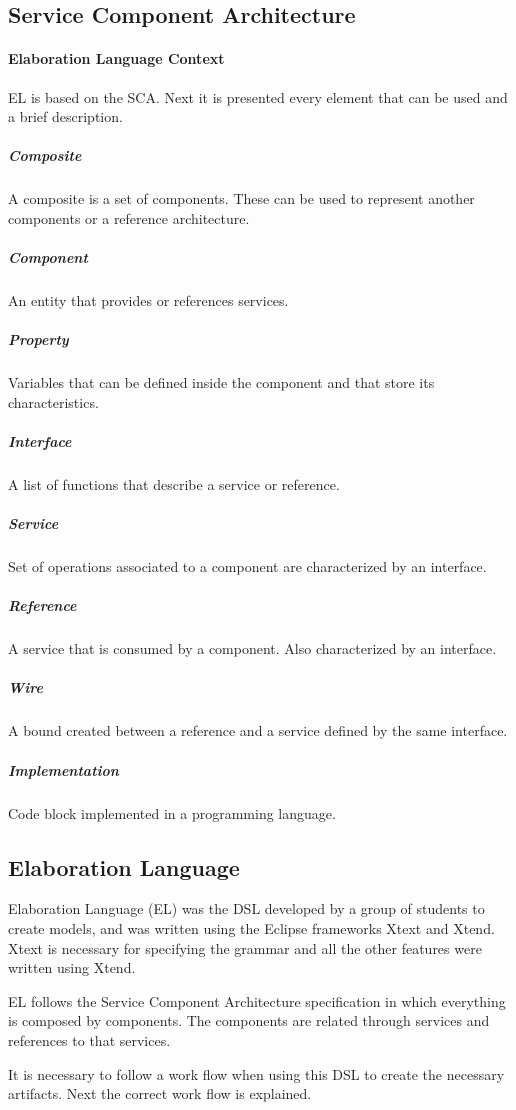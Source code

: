 \documentclass{report}
\begin{document}
		\subsection{Service Component Architecture}
		\par 
		
		\paragraph{Elaboration Language Context} EL is based on the SCA. Next it is presented every element that can be used and a brief description.
		
			\subparagraph{Composite} A composite is a set of components. These can be used to represent another components or a reference architecture.
		
			\subparagraph{Component} An entity that provides or references services. 
		
			\subparagraph{Property} Variables that can be defined inside the component and that store its characteristics. 
		
			\subparagraph{Interface} A list of functions that describe a service or reference.
		
			\subparagraph{Service} Set of operations associated to a component are characterized by an interface. 
		
			\subparagraph{Reference} A service that is consumed by a component. Also characterized by an interface.
		
			\subparagraph{Wire} A bound created between a reference and a service defined by the same interface.
		
			\subparagraph{Implementation} Code block implemented in a programming language.
		
		\subsection{Elaboration Language}
		
		\par Elaboration Language (EL) was the DSL developed by a group of students to create models, and was written using the Eclipse frameworks Xtext and Xtend. Xtext is necessary for specifying the grammar and all the other features were written using Xtend. 
		\par EL follows the Service Component Architecture specification in which everything is composed by components. The components are related through services and references to that services. 
		\par It is necessary to follow a work flow when using this DSL to create the necessary artifacts. Next the correct work flow is explained.
\end{document}
